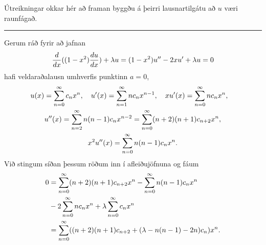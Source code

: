 Útreikningar okkar hér að framan byggðu á þeirri lausnartilgátu að $u$
væri raunfágað. 

\bigskip\hrule\bigskip

\begin{sy}\label{syn3.2.9}  Gerum ráð fyrir að jafnan
$$\dfrac {d}{dx}((1-x\sp 2)\dfrac{du}{dx})+\lambda u=
(1-x\sp 2)u{\sp{\prime\prime}}-2xu{\sp{\prime}}+\lambda u=0
$$
hafi veldaraðalausn umhverfis punktinn $a=0$, 
\begin{gather*}
u(x)=\sum\limits_{n=0}\sp\infty c_nx\sp n, \quad
u{\sp{\prime}}(x)=\sum\limits_{n=1}\sp\infty nc_nx\sp{n-1}, \quad 
xu{\sp{\prime}}(x)=\sum\limits_{n=0}\sp\infty nc_nx\sp n, \quad
\\
u{\sp{\prime\prime}}(x)
=\sum\limits_{n=2}\sp\infty n(n-1)c_nx\sp {n-2}=
\sum\limits_{n=0}\sp\infty (n+2)(n+1)c_{n+2}x\sp n,\\
x\sp 2u{\sp{\prime\prime}}(x)=\sum\limits_{n=0}\sp\infty n(n-1)c_nx\sp n.
\end{gather*}
Við stingum síðan þessum röðum inn í afleiðujöfnuna og fáum
\begin{align*}
0&=
\sum\limits_{n=0}\sp\infty (n+2)(n+1)c_{n+2}x\sp n -
\sum\limits_{n=0}\sp\infty n(n-1)c_nx\sp n\\
&-2\sum\limits_{n=0}\sp\infty nc_nx\sp n+
\lambda\sum\limits_{n=0}\sp\infty c_nx\sp n
\\
&=\sum\limits_{n=0}\sp\infty
((n+2)(n+1)c_{n+2} +(\lambda-n(n-1)-2n)c_n)x\sp n.
\end{align*}
 

\end{sy}

